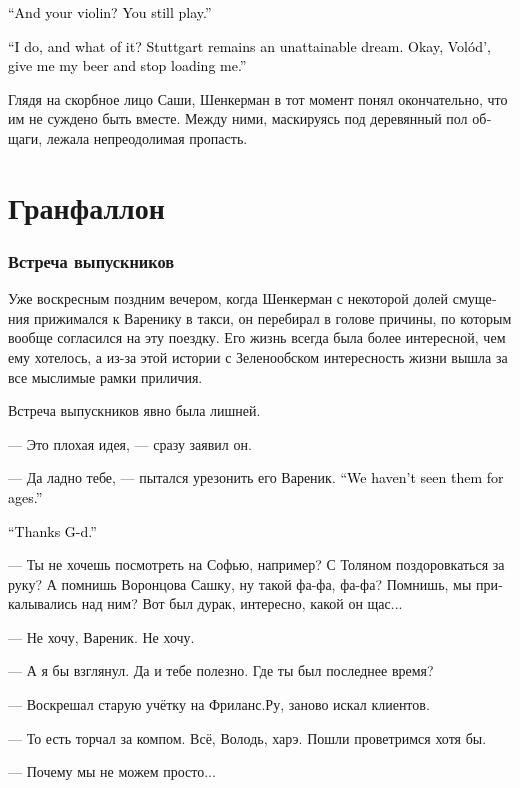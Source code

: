 \documentclass[a5paper,12pt,fleqn]{extbook}\usepackage{cooltooltips}\usepackage{polyglossia}\setdefaultlanguage[babelshorthands=true]{russian}\setotherlanguage{english}\defaultfontfeatures{Ligatures=TeX,Mapping=tex-text} \usepackage{xcolor}\definecolor{lightgray}{HTML}{bbbbbb}\color{lightgray}\newcommand{\ml}[3]{\textenglish{\textcolor{black}{#3}}}
\newcommand{\Volod}{Vol\'od'}
\begin{document}
\ml{$0$}
{--- А скрипка?}
{``And your violin?}
\ml{$0$}
{Ты ведь играешь до сих пор.}
{You still play.''}

\ml{$0$}
{--- Играю, и что с того?}
{``I do, and what of it?}
\ml{$0$}
{Штутгарт так и остался недосягаемой мечтой.}
{Stuttgart remains an unattainable dream.}
\ml{$0$}
{Всё, Володь, передай мне пиво и хватит меня грузить.}
{Okay, \Volod, give me my beer and stop loading me.''}

Глядя на скорбное лицо Саши, Шенкерман в тот момент понял окончательно, что им не суждено быть вместе.
Между ними, маскируясь под деревянный пол общаги, лежала непреодолимая пропасть.

\chapter{Гранфаллон}

\subsection{Встреча выпускников}

Уже воскресным поздним вечером, когда Шенкерман с некоторой долей смущения прижимался к Варенику в такси, он перебирал в голове причины, по которым вообще согласился на эту поездку.
Его жизнь всегда была более интересной, чем ему хотелось, а из-за этой истории с Зеленообском интересность жизни вышла за все мыслимые рамки приличия.

Встреча выпускников явно была лишней.

--- Это плохая идея, --- сразу заявил он.

--- Да ладно тебе, --- пытался урезонить его Вареник.
\ml{$0$}
{--- Давно же не виделись.}
{``We haven't seen them for ages.''}

\ml{$0$}
{--- И слава Б-гу.}
{``Thanks G-d.''}

--- Ты не хочешь посмотреть на Софью, например?
С Толяном поздоровкаться за руку?
А помнишь Воронцова Сашку, ну такой фа-фа, фа-фа?
Помнишь, мы прикалывались над ним?
Вот был дурак, интересно, какой он щас...

--- Не хочу, Вареник.
Не хочу.

--- А я бы взглянул.
Да и тебе полезно.
Где ты был последнее время?

--- Воскрешал старую учётку на Фриланс.Ру, заново искал клиентов.

--- То есть торчал за компом.
Всё, Володь, харэ.
Пошли проветримся хотя бы.

--- Почему мы не можем просто...
\end{document}
